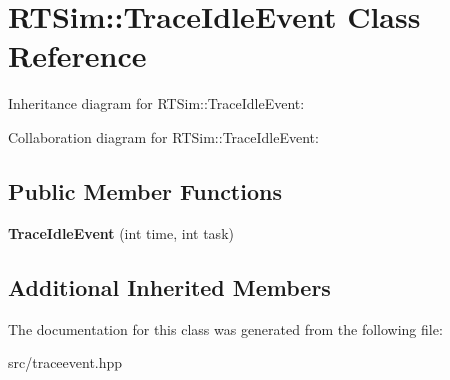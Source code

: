 \hypertarget{classRTSim_1_1TraceIdleEvent}{}\section{R\+T\+Sim\+:\+:Trace\+Idle\+Event Class Reference}
\label{classRTSim_1_1TraceIdleEvent}


Inheritance diagram for R\+T\+Sim\+:\+:Trace\+Idle\+Event\+:


Collaboration diagram for R\+T\+Sim\+:\+:Trace\+Idle\+Event\+:
\subsection*{Public Member Functions}
\begin{DoxyCompactItemize}
\item 
{\bfseries Trace\+Idle\+Event} (int time, int task)\hypertarget{classRTSim_1_1TraceIdleEvent_a8b00f0556a2d61270e84213d412c8116}{}\label{classRTSim_1_1TraceIdleEvent_a8b00f0556a2d61270e84213d412c8116}

\end{DoxyCompactItemize}
\subsection*{Additional Inherited Members}


The documentation for this class was generated from the following file\+:\begin{DoxyCompactItemize}
\item 
src/traceevent.\+hpp\end{DoxyCompactItemize}
